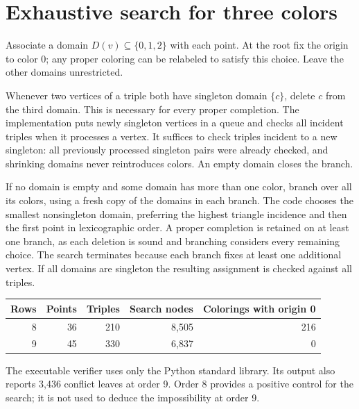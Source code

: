 \documentclass[11pt]{amsart}
\begin{document}
\section{Exhaustive search for three colors}
Associate a domain $D(v)\subseteq\{0,1,2\}$ with each point. At the root fix the origin to color 0; any proper coloring can be relabeled to satisfy this choice. Leave the other domains unrestricted.
\par
Whenever two vertices of a triple both have singleton domain $\{c\}$, delete $c$ from the third domain. This is necessary for every proper completion. The implementation puts newly singleton vertices in a queue and checks all incident triples when it processes a vertex. It suffices to check triples incident to a new singleton: all previously processed singleton pairs were already checked, and shrinking domains never reintroduces colors. An empty domain closes the branch.
\par
If no domain is empty and some domain has more than one color, branch over all its colors, using a fresh copy of the domains in each branch. The code chooses the smallest nonsingleton domain, preferring the highest triangle incidence and then the first point in lexicographic order. A proper completion is retained on at least one branch, as each deletion is sound and branching considers every remaining choice. The search terminates because each branch fixes at least one additional vertex. If all domains are singleton the resulting assignment is checked against all triples.
\begin{center}
\begin{tabular}{rrrrr}
\toprule
Rows & Points & Triples & Search nodes & Colorings with origin 0\\
\midrule
8 & 36 & 210 & 8,505 & 216\\
9 & 45 & 330 & 6,837 & 0\\
\bottomrule
\end{tabular}
\end{center}
The executable verifier uses only the Python standard library. Its output also reports 3,436 conflict leaves at order 9. Order 8 provides a positive control for the search; it is not used to deduce the impossibility at order 9.
\end{document}
